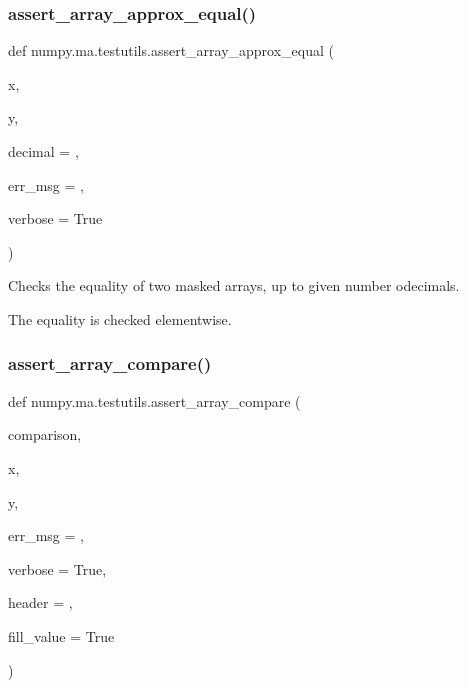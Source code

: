 \subsubsection{\texorpdfstring{assert\+\_\+array\+\_\+approx\+\_\+equal()}{assert\_array\_approx\_equal()}}
{\footnotesize\ttfamily def numpy.\+ma.\+testutils.\+assert\+\_\+array\+\_\+approx\+\_\+equal (\begin{DoxyParamCaption}\item[{}]{x,  }\item[{}]{y,  }\item[{}]{decimal = {},  }\item[{}]{err\+\_\+msg = {\ttfamily \textquotesingle{}\textquotesingle{}},  }\item[{}]{verbose = {\ttfamily True} }\end{DoxyParamCaption})}

\begin{DoxyVerb}Checks the equality of two masked arrays, up to given number odecimals.

The equality is checked elementwise.\end{DoxyVerb}
 \mbox{\label{namespacenumpy_1_1ma_1_1testutils_adf7ee5d1d3849b011141e565b24735ad}} 
\subsubsection{\texorpdfstring{assert\+\_\+array\+\_\+compare()}{assert\_array\_compare()}}
{\footnotesize\ttfamily def numpy.\+ma.\+testutils.\+assert\+\_\+array\+\_\+compare (\begin{DoxyParamCaption}\item[{}]{comparison,  }\item[{}]{x,  }\item[{}]{y,  }\item[{}]{err\+\_\+msg = {\ttfamily \textquotesingle{}\textquotesingle{}},  }\item[{}]{verbose = {\ttfamily True},  }\item[{}]{header = {\ttfamily \textquotesingle{}\textquotesingle{}},  }\item[{}]{fill\+\_\+value = {\ttfamily True} }\end{DoxyParamCaption})}

